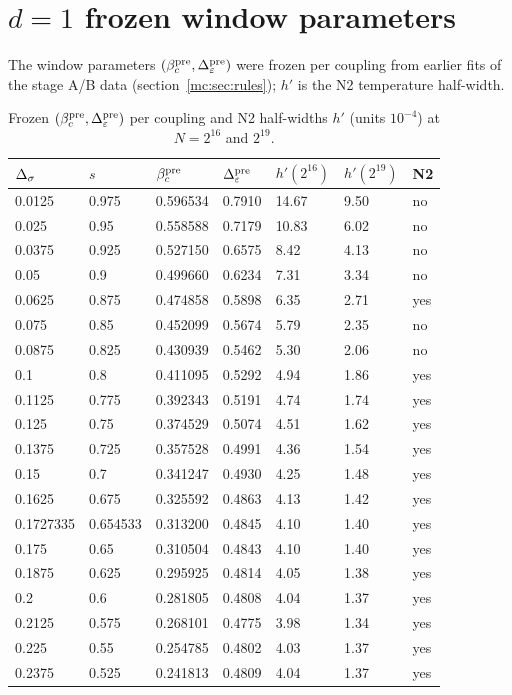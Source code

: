 \appendix
\section{\texorpdfstring{$d=1$ frozen window parameters}{d=1 frozen window parameters}}\label{mc:app:pre}
The window parameters $(\beta_c^{\rm pre},\Delta_\varepsilon^{\rm pre})$ were frozen per coupling from earlier fits of the stage A/B data
(section~\ref{mc:sec:rules}); $h'$ is the N2 temperature half-width.
\begin{table}[htbp]\centering\small
\caption{Frozen $(\beta_c^{\rm pre},\Delta_\varepsilon^{\rm pre})$ per coupling and N2 half-widths $h'$ (units $10^{-4}$) at $N=2^{16}$ and $2^{19}$.}
\begin{tabular}{@{}lllllll@{}}\toprule
$\Delta_\sigma$ & $s$ & $\beta_c^{\rm pre}$ & $\Delta_\varepsilon^{\rm pre}$ & $h'(2^{16})$ & $h'(2^{19})$ & N2 \\\midrule
0.0125 & 0.975 & 0.596534 & 0.7910 & 14.67 & 9.50 & no \\
0.025 & 0.95 & 0.558588 & 0.7179 & 10.83 & 6.02 & no \\
0.0375 & 0.925 & 0.527150 & 0.6575 & 8.42 & 4.13 & no \\
0.05 & 0.9 & 0.499660 & 0.6234 & 7.31 & 3.34 & no \\
0.0625 & 0.875 & 0.474858 & 0.5898 & 6.35 & 2.71 & yes \\
0.075 & 0.85 & 0.452099 & 0.5674 & 5.79 & 2.35 & no \\
0.0875 & 0.825 & 0.430939 & 0.5462 & 5.30 & 2.06 & no \\
0.1 & 0.8 & 0.411095 & 0.5292 & 4.94 & 1.86 & yes \\
0.1125 & 0.775 & 0.392343 & 0.5191 & 4.74 & 1.74 & yes \\
0.125 & 0.75 & 0.374529 & 0.5074 & 4.51 & 1.62 & yes \\
0.1375 & 0.725 & 0.357528 & 0.4991 & 4.36 & 1.54 & yes \\
0.15 & 0.7 & 0.341247 & 0.4930 & 4.25 & 1.48 & yes \\
0.1625 & 0.675 & 0.325592 & 0.4863 & 4.13 & 1.42 & yes \\
0.1727335 & 0.654533 & 0.313200 & 0.4845 & 4.10 & 1.40 & yes \\
0.175 & 0.65 & 0.310504 & 0.4843 & 4.10 & 1.40 & yes \\
0.1875 & 0.625 & 0.295925 & 0.4814 & 4.05 & 1.38 & yes \\
0.2 & 0.6 & 0.281805 & 0.4808 & 4.04 & 1.37 & yes \\
0.2125 & 0.575 & 0.268101 & 0.4775 & 3.98 & 1.34 & yes \\
0.225 & 0.55 & 0.254785 & 0.4802 & 4.03 & 1.37 & yes \\
0.2375 & 0.525 & 0.241813 & 0.4809 & 4.04 & 1.37 & yes \\
\bottomrule\end{tabular}
\end{table}

